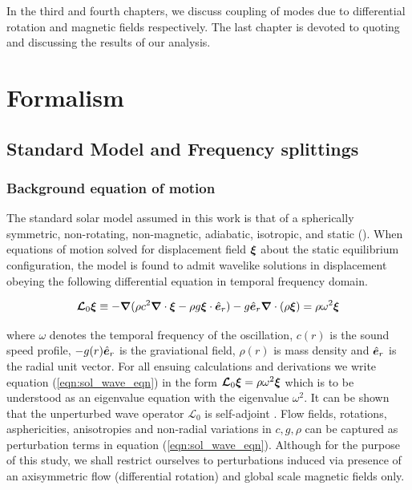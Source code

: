 In the third and fourth chapters, we discuss coupling of modes due to differential rotation and magnetic fields respectively. The last chapter is devoted to quoting and discussing the results of our analysis.
\chapter{Formalism}

\section{Standard Model and Frequency splittings} %
\subsection{Background equation of motion}
The standard solar model assumed in this work is that of a spherically symmetric, non-rotating, non-magnetic, adiabatic, isotropic, and static (\snr). When equations of motion solved for displacement field $\bm{\xi}$ about the static equilibrium configuration, the \snr model is found to admit wavelike solutions in displacement obeying the following differential equation in temporal frequency domain.

\begin{equation} \label{eqn:sol_wave_eqn}
\bm{\mathcal{L}}_0 \bm{\xi}  \equiv - \bm{\nabla} (\rho c^2 \boldsymbol{\nabla} \cdot \boldsymbol{\xi} - \rho g \boldsymbol{\xi} \cdot \hat{\bm{e}}_{r}) - g \hat{\bm{e}}_{r} \boldsymbol{\nabla} \cdot (\rho \boldsymbol{\xi}) = \rho \omega^2 \bm{\xi}
\end{equation}


where $\omega$ denotes the temporal frequency of the oscillation, $c(r)$ is the sound speed profile, $-g(r)\hat{\bm{e}}_{r}$ is the graviational field, $\rho(r)$ is mass density and $\hat{\bm{e}}_{r}$ is the radial unit vector. For all ensuing calculations and derivations we write equation (\ref{eqn:sol_wave_eqn}) in the form $\bm{\mathcal{L}}_0 \boldsymbol{\xi} = \rho \omega^2 \boldsymbol{\xi}$ which is to be understood as an eigenvalue equation with the eigenvalue $\omega^2$. It can be shown that the unperturbed wave operator $\mathcal{L}_0$ is self-adjoint \cite{goedbloed2004}. Flow fields, rotations, asphericities, anisotropies and non-radial variations in $c, g, \rho$ can be captured as perturbation terms in equation (\ref{eqn:sol_wave_eqn}). Although for the purpose of this study, we shall restrict ourselves to perturbations induced via presence of an axisymmetric flow (differential rotation) and global scale magnetic fields only.


